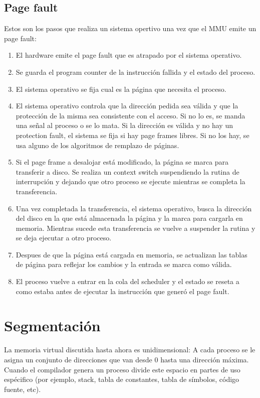 \subsection{Page fault}
Estos son los pasos que realiza un sistema opertivo una vez que el MMU emite un page fault:

\begin{enumerate}
	\item El hardware emite el page fault que es atrapado por el sistema operativo.
	\item Se guarda el program counter de la instrucción fallida y el estado del proceso.
	\item El sistema operativo se fija cual es la página que necesita el proceso. 
	\item El sistema operativo controla que la dirección pedida sea válida y que la protección de la misma sea consistente con el acceso. Si no lo es, se manda una señal al proceso o se lo mata. Si la dirección es válida y no hay un protection fault, el sistema se fija si hay page frames libres. Si no los hay, se usa alguno de los algoritmos de remplazo de páginas.
	\item Si el page frame a desalojar está modificado, la página se marca para transferir a disco. Se realiza un context switch suspendiendo la rutina de interrupción y dejando que otro proceso se ejecute mientras se completa la transferencia.
	\item Una vez completada la transferencia, el sistema operativo, busca la dirección del disco en la que está almacenada la página y la marca para cargarla en memoria. Mientras sucede esta transferencia se vuelve a suspender la rutina y se deja ejecutar a otro proceso.
	\item Despues de que la página está cargada en memoria, se actualizan las tablas de página para reflejar los cambios y la entrada se marca como válida.
	\item El proceso vuelve a entrar en la cola del scheduler y el estado se reseta a como estaba antes de ejecutar la instrucción que generó el page fault.
\end{enumerate}

\printbibliography[keyword=memoriaVirtual, title=Bibliografía]

\newpage
\section{Segmentación}
La memoria virtual discutida hasta ahora es unidimensional: A cada proceso se le asigna un conjunto de direcciones que van desde 0 hasta una dirección máxima. Cuando el compilador genera un proceso divide este espacio en partes de uso espécifico (por ejemplo, stack, tabla de constantes, tabla de símbolos, código fuente, etc). 

